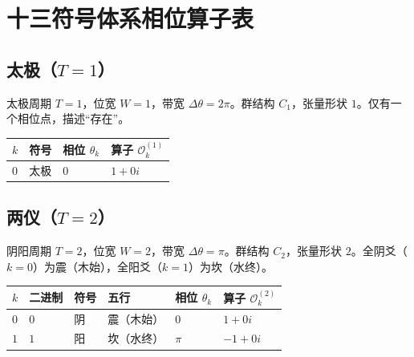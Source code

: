 \section{十三符号体系相位算子表}

\subsection{\texorpdfstring{太极（$T=1$）}{太极（T=1）}}

\begin{definition}[太极相位算子]\label{def:taiji_operators}
太极周期 $T=1$，位宽 $W=1$，带宽 $\Delta\theta=2\pi$。群结构 $C_1$，张量形状 $1$。仅有一个相位点，描述“存在”。
\end{definition}

\begin{center}
\begin{tabular}{>{\centering\arraybackslash}p{1.2cm}>{\centering\arraybackslash}p{2cm}>{\centering\arraybackslash}p{2.5cm}>{\centering\arraybackslash}p{3.5cm}}
\toprule
$k$ & 符号 & 相位 $\theta_k$ & 算子 $\mathcal{O}_k^{(1)}$ \\
\midrule
$0$ & 太极 & $0$ & $1+0i$ \\
\bottomrule
\end{tabular}
\end{center}

\subsection{\texorpdfstring{两仪（$T=2$）}{两仪（T=2）}}

\begin{definition}[阴阳相位算子]\label{def:yinyang_operators}
阴阳周期 $T=2$，位宽 $W=2$，带宽 $\Delta\theta=\pi$。群结构 $C_2$，张量形状 $2$。全阴爻（$k=0$）为震（木始），全阳爻（$k=1$）为坎（水终）。
\end{definition}

\begin{center}
\begin{tabular}{>{\centering\arraybackslash}p{1.2cm}>{\centering\arraybackslash}p{1.2cm}>{\centering\arraybackslash}p{1.5cm}>{\centering\arraybackslash}p{2cm}>{\centering\arraybackslash}p{2.5cm}>{\centering\arraybackslash}p{3cm}}
\toprule
$k$ & 二进制 & 符号 & 五行 & 相位 $\theta_k$ & 算子 $\mathcal{O}_k^{(2)}$ \\
\midrule
$0$ & $0$ & 阴 & 震（木始） & $0$ & $1+0i$ \\
$1$ & $1$ & 阳 & 坎（水终） & $\pi$ & $-1+0i$ \\
\bottomrule
\end{tabular}
\end{center}

